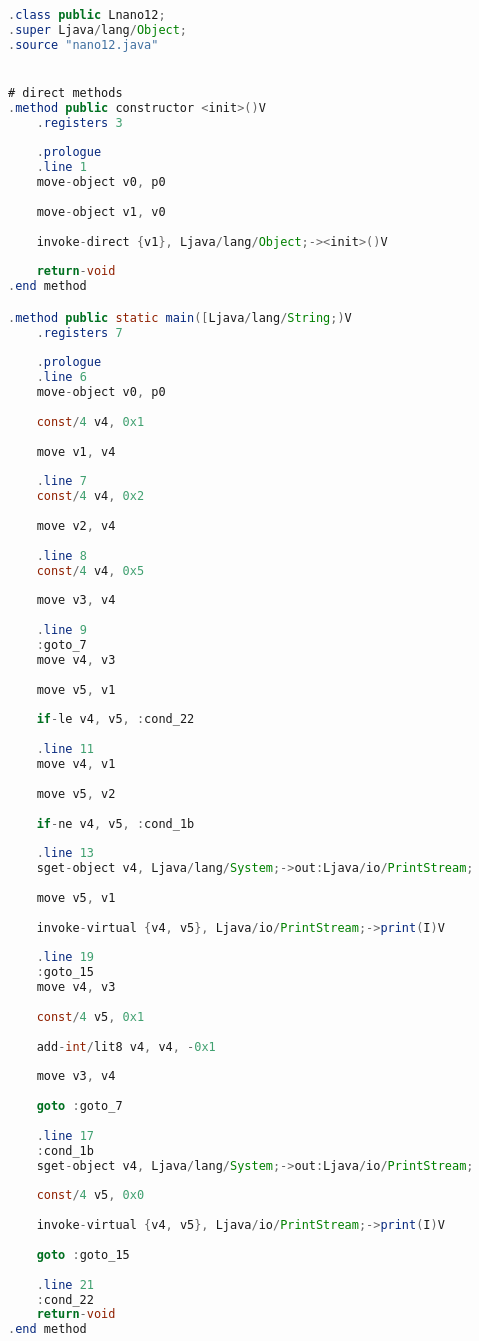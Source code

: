 \documentclass[hidelinks,12pt]{article}
\begin{document}
	\begin{lstlisting}[caption=Smali resultante do .java,language=java]
.class public Lnano12;
.super Ljava/lang/Object;
.source "nano12.java"


# direct methods
.method public constructor <init>()V
	.registers 3
	
	.prologue
	.line 1
	move-object v0, p0
	
	move-object v1, v0
	
	invoke-direct {v1}, Ljava/lang/Object;-><init>()V
	
	return-void
.end method

.method public static main([Ljava/lang/String;)V
	.registers 7
	
	.prologue
	.line 6
	move-object v0, p0
	
	const/4 v4, 0x1
	
	move v1, v4
	
	.line 7
	const/4 v4, 0x2
	
	move v2, v4
	
	.line 8
	const/4 v4, 0x5
	
	move v3, v4
	
	.line 9
	:goto_7
	move v4, v3
	
	move v5, v1
	
	if-le v4, v5, :cond_22
	
	.line 11
	move v4, v1
	
	move v5, v2
	
	if-ne v4, v5, :cond_1b
	
	.line 13
	sget-object v4, Ljava/lang/System;->out:Ljava/io/PrintStream;
	
	move v5, v1
	
	invoke-virtual {v4, v5}, Ljava/io/PrintStream;->print(I)V
	
	.line 19
	:goto_15
	move v4, v3
	
	const/4 v5, 0x1
	
	add-int/lit8 v4, v4, -0x1
	
	move v3, v4
	
	goto :goto_7
	
	.line 17
	:cond_1b
	sget-object v4, Ljava/lang/System;->out:Ljava/io/PrintStream;
	
	const/4 v5, 0x0
	
	invoke-virtual {v4, v5}, Ljava/io/PrintStream;->print(I)V
	
	goto :goto_15
	
	.line 21
	:cond_22
	return-void
.end method	
	
	\end{lstlisting}
	
\end{document}
